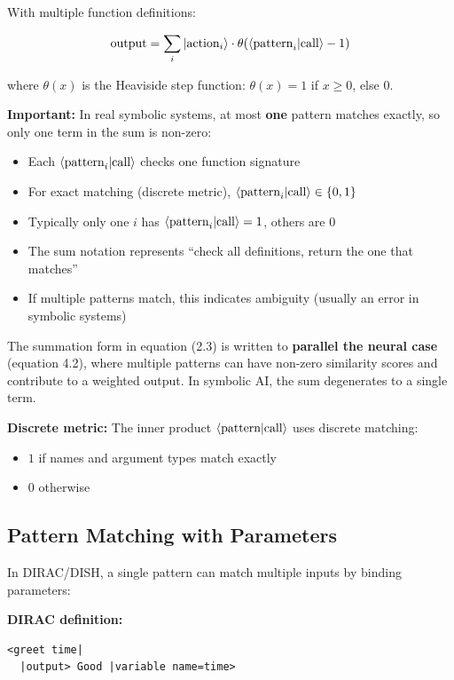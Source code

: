 \documentclass[11pt,a4paper]{article}
\theoremstyle{definition}
\begin{document}
With multiple function definitions:

\begin{equation}
\text{output} = \sum_i \ket{\text{action}_i} \cdot \theta(\braket{\text{pattern}_i|\text{call}} - 1)
\end{equation}

where $\theta(x)$ is the Heaviside step function: $\theta(x) = 1$ if $x \geq 0$, else $0$.

\textbf{Important:} In real symbolic systems, at most \textbf{one} pattern matches exactly, so only one term in the sum is non-zero:
\begin{itemize}
\item Each $\braket{\text{pattern}_i|\text{call}}$ checks one function signature
\item For exact matching (discrete metric), $\braket{\text{pattern}_i|\text{call}} \in \{0, 1\}$
\item Typically only one $i$ has $\braket{\text{pattern}_i|\text{call}} = 1$, others are 0
\item The sum notation represents ``check all definitions, return the one that matches''
\item If multiple patterns match, this indicates ambiguity (usually an error in symbolic systems)
\end{itemize}

The summation form in equation (2.3) is written to \textbf{parallel the neural case} (equation 4.2), where multiple patterns can have non-zero similarity scores and contribute to a weighted output. In symbolic AI, the sum degenerates to a single term.

\textbf{Discrete metric:} The inner product $\braket{\text{pattern}|\text{call}}$ uses discrete matching:
\begin{itemize}
\item $1$ if names and argument types match exactly
\item $0$ otherwise
\end{itemize}

\subsection{Pattern Matching with Parameters}

In DIRAC/DISH, a single pattern can match multiple inputs by binding parameters:

\textbf{DIRAC definition:}
\begin{lstlisting}
<greet time|
  |output> Good |variable name=time>
\end{lstlisting}
\end{document}
